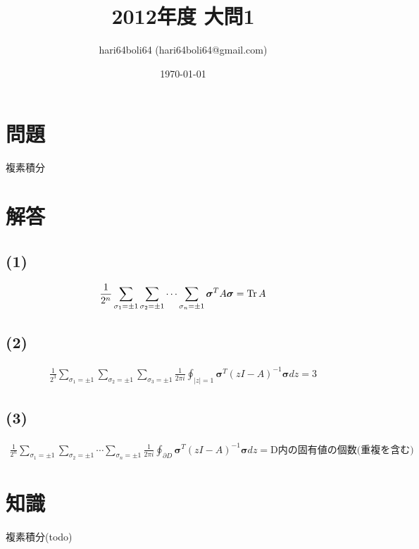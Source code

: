 \documentclass[a4paper, 10pt, dvipdfmx]{jlreq}
\begin{document}
\title{2012年度 大問1}
\author{hari64boli64 (hari64boli64@gmail.com)}
\date{\today}
\maketitle

\section{問題}

複素積分

\section{解答}

\subsection*{(1)}

\begin{align*}
  \frac{1}{2^n}\sum_{\sigma_1=\pm1}\sum_{\sigma_2=\pm1}\cdots\sum_{\sigma_n=\pm1}\bm{\sigma}^TA\bm{\sigma}=\Tr A
\end{align*}

\subsection*{(2)}

\begin{align*}
  \frac{1}{2^3}\sum_{\sigma_1=\pm1}\sum_{\sigma_2=\pm1}\sum_{\sigma_3=\pm1}\frac{1}{2 \pi i}\oint_{|z|=1}\bm{\sigma}^T(zI-A)^{-1}\bm{\sigma}dz=3
\end{align*}

\subsection*{(3)}

\begin{align*}
  \frac{1}{2^n}\sum_{\sigma_1=\pm1}\sum_{\sigma_2=\pm1}\cdots\sum_{\sigma_n=\pm1}\frac{1}{2 \pi i}\oint_{\partial D}\bm{\sigma}^T(zI-A)^{-1}\bm{\sigma}dz=\text{D内の固有値の個数(重複を含む)}
\end{align*}

\section{知識}

複素積分(todo)


\end{document}
